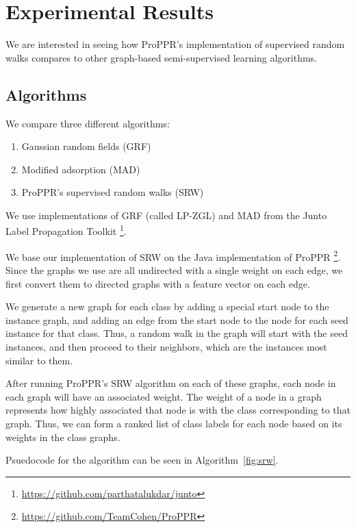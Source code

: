 \documentclass[12pt]{article}
\begin{document}
\section{Experimental Results}
We are interested in seeing how ProPPR's implementation of supervised random walks compares to other graph-based semi-supervised learning algorithms.

\subsection{Algorithms}
We compare three different algorithms:
\begin{enumerate}
\item Gaussian random fields (GRF)
\item Modified adsorption (MAD)
\item ProPPR's supervised random walks (SRW)
\end{enumerate}

We use implementations of GRF (called LP-ZGL) and MAD from the Junto Label Propagation Toolkit \footnote{\url{https://github.com/parthatalukdar/junto}}.

We base our implementation of SRW on the Java implementation of ProPPR \footnote{\url{https://github.com/TeamCohen/ProPPR}}. Since the graphs we use are all undirected with a single weight on each edge, we first convert them to directed graphs with a feature vector on each edge.

We generate a new graph for each class by adding a special start node to the instance graph, and adding an edge from the start node to the node for each seed instance for that class.
Thus, a random walk in the graph will start with the seed instances, and then proceed to their neighbors, which are the instances most similar to them.

After running ProPPR's SRW algorithm on each of these graphs, each node in each graph will have an associated weight.
The weight of a node in a graph represents how highly associated that node is with the class corresponding to that graph.
Thus, we can form a ranked list of class labels for each node based on its weights in the class graphs.

Psuedocode for the algorithm can be seen in Algorithm~\ref{fig:srw}.
\end{document}
